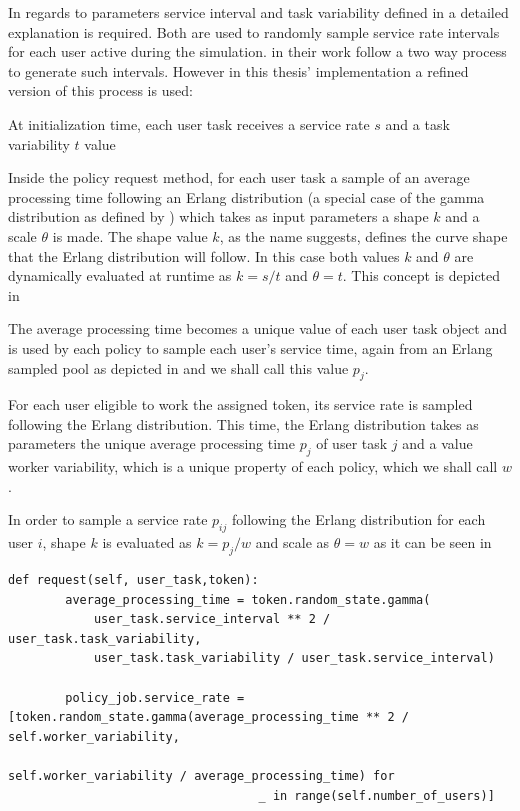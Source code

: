\documentclass[draft=false]{seal_thesis}
\begin{document}
In regards to parameters service interval and task variability defined in  a detailed explanation is required. Both are used to randomly sample service rate intervals for each user active during the simulation. \citet[p. 8]{Zeng2005} in their work follow a two way process to generate such intervals. However in this thesis' implementation a refined version of this process is used:
\begin{enumerate*}
	\item At initialization time, each user task receives a service rate $s$ and a task variability $t$ value
	\item Inside the policy request method, for each user task a sample of an average processing time following an Erlang distribution (a special case of the gamma distribution as defined by \citet{Adan2016}) which takes as input parameters a shape $k$ and a scale $\theta$ is made. The shape value $k$, as the name suggests, defines the curve shape that the Erlang distribution will follow. In this case both values $k$ and $\theta$ are dynamically evaluated at runtime as $k=s/t$ and $\theta = t$. This concept is depicted in 
	\item The average processing time becomes a unique value of each user task object and is used by each policy to sample each user's service time, again from an Erlang sampled pool as depicted in  and we shall call this value $p_j$.
\end{enumerate*}

For each user eligible to work the assigned token, its service rate is sampled following the Erlang distribution. This time, the Erlang distribution takes as parameters the unique average processing time $p_j$ of user task $j$ and a value worker variability, which is a unique property of each policy, which we shall call $w$.

In order to sample a service rate $p_{ij}$ following the Erlang distribution for each user $i$, shape $k$ is evaluated as $k=p_j/w$ and scale as $\theta = w$ as it can be seen in 

\begin{lstlisting}[caption=User service rate sampling following an Erlang distribution,label=lst:user_service_rate,style=CustomPython]
    def request(self, user_task,token):
        average_processing_time = token.random_state.gamma(
            user_task.service_interval ** 2 / user_task.task_variability,
            user_task.task_variability / user_task.service_interval)

        policy_job.service_rate = [token.random_state.gamma(average_processing_time ** 2 / self.worker_variability,
                                                           self.worker_variability / average_processing_time) for
                                   _ in range(self.number_of_users)]
\end{lstlisting}
\end{document}
